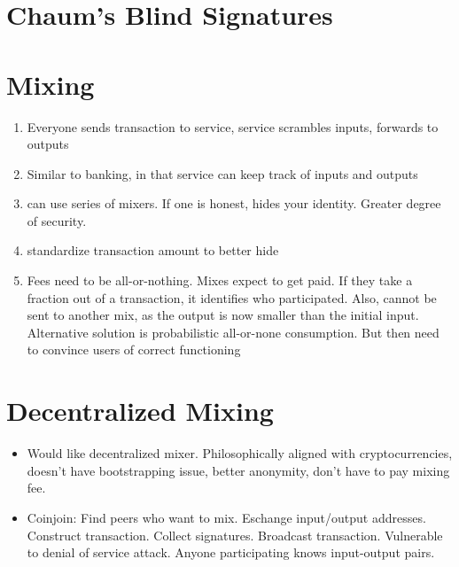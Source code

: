 \documentclass{article}
\begin{document}
\section{Chaum's Blind Signatures}

\section{Mixing}
\begin{enumerate}
\item Everyone sends transaction to service, service scrambles inputs, forwards to outputs
\item Similar to banking, in that service can keep track of inputs and outputs
\item can use series of mixers. If one is honest, hides your identity. Greater degree of security.
\item standardize transaction amount to better hide
\item Fees need to be all-or-nothing. Mixes expect to get paid. If they take a fraction out of a transaction, it identifies who participated. Also, cannot be sent to another mix, as the output is now smaller than the initial input. Alternative solution is probabilistic all-or-none consumption. But then need to convince users of correct functioning
\end{enumerate}

\section{Decentralized Mixing}
\begin{itemize}
\item Would like decentralized mixer. Philosophically aligned with cryptocurrencies, doesn't have bootstrapping issue, better anonymity, don't have to pay mixing fee.
\item Coinjoin: Find peers who want to mix. Eschange input/output addresses. Construct transaction. Collect signatures. Broadcast transaction. 
\subitem Vulnerable to denial of service attack. Anyone participating knows input-output pairs.
\end{itemize}
\end{document}
